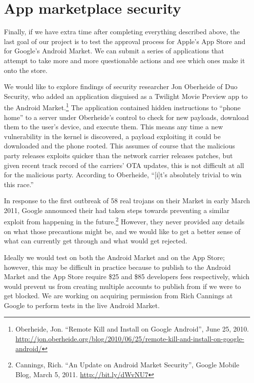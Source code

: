 \documentclass[11pt]{article}
\begin{document}
\section{App marketplace security}
Finally, if we have extra time after completing everything described above, the
last goal of our project is to test the approval process for Apple's App Store
and for Google's Android Market. We can submit a series of applications that
attempt to take more and more questionable actions and see which ones make it
onto the store.

We would like to explore findings of security researcher Jon Oberheide of Duo
Security, who added an application disguised as a Twilight Movie Preview app to
the Android Market.\footnote{Oberheide, Jon. ``Remote Kill and Install on
Google Android'', June 25, 2010.
\url{http://jon.oberheide.org/blog/2010/06/25/remote-kill-and-install-on-google-android/}}
The application contained hidden instructions to ``phone home'' to a server
under Oberheide's control to check for new payloads, download them to the
user's device, and execute them. This means any time a new vulnerability in the
kernel is discovered, a payload exploiting it could be downloaded and the phone
rooted. This assumes of course that the malicious party releases exploits
quicker than the network carrier releases patches, but given recent track
record of the carriers' OTA updates, this is not difficult at all for the
malicious party. According to Oberheide, ``[i]t's absolutely trivial to win
this race.''

In response to the first outbreak of 58 real trojans on their Market in early
March 2011, Google announced their had taken steps towards preventing a similar
exploit from happening in the future.\footnote{Cannings, Rich. ``An Update on
Android Market Security'', Google Mobile Blog, March 5, 2011.
\url{http://bit.ly/dWvNU7}} However, they never provided any details on what
those precautions might be, and we would like to get a better sense of what can
currently get through and what would get rejected.

Ideally we would test on both the Android Market and on the App Store; however,
this may be difficult in practice because to publish to the Android Market and
the App Store require \$25 and \$85 developers fees respectively, which would
prevent us from creating multiple accounts to publish from if we were to get
blocked. We are working on acquiring permission from Rich Cannings at Google
to perform tests in the live Android Market.
\end{document}
